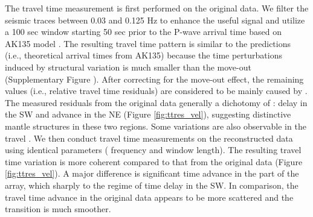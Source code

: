 The travel time measurement is first performed on the original data. We filter the seismic traces between 0.03 and 0.125 Hz to enhance the useful signal and utilize a 100 sec  window starting 50 sec prior to the  P-wave arrival time based on AK135 model \cite{kennett1995constraints}. The resulting travel time pattern is similar to the predictions (i.e., theoretical arrival times from AK135) because the time perturbations induced by structural variation is much smaller than the move-out (Supplementary Figure \color{blue}{13}\color{black}{}). After correcting for the move-out effect, the remaining values (i.e., relative travel time residuals) are considered to be mainly caused by . The measured residuals from the original data generally  a dichotomy of : delay in the SW and advance in the NE (Figure \ref{fig:ttres_vel}\color{blue}{(a)}\color{black}{}), suggesting distinctive mantle structures in these two regions.  Some  variations are also observable in the travel . We then conduct travel time measurements on the reconstructed data using identical parameters ( frequency and window length).   The resulting travel time variation is more coherent compared to that from the original data (Figure \ref{fig:ttres_vel}\color{blue}{(b)}\color{black}{}). A major difference is  significant time advance in the  part of the array, which  sharply to the regime of time delay in the SW.   In comparison, the travel time advance in the original data appears to be more scattered and the transition is much smoother. 

